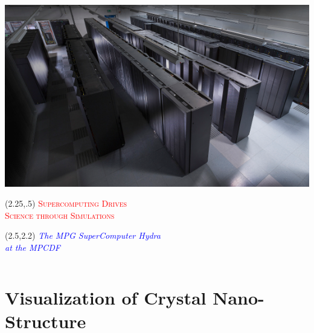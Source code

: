 \documentclass[]{beamer}
\begin{document}
\begin{frame}
\begin{columns}
    \begin{column}{0.45\textwidth}
        \includegraphics[width=1.1\textwidth]{pics/Hydra570.png}
        \begin{textblock}{5}(2.25,.5)
            \footnotesize\scshape{\textcolor{red}{Supercomputing Drives\\ Science through Simulations}}
        \end{textblock}
        \begin{textblock}{5}(2.5,2.2)
            \scriptsize\itshape{\textcolor{blue}{The MPG SuperComputer \textit{Hydra}\\ at the MPCDF}}
        \end{textblock}
    \end{column}

\end{columns}
\end{frame}
\section{Visualization of Crystal Nano-Structure}
\end{document}
